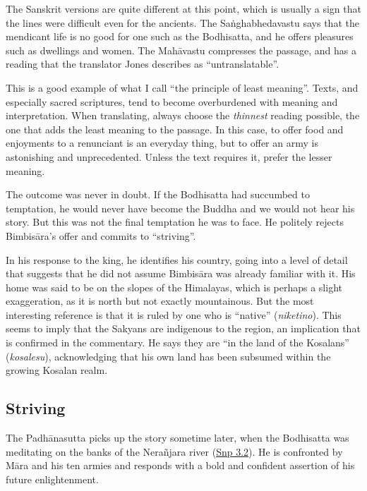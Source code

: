 \documentclass[12pt,openany]{book}%
\begin{document}
The Sanskrit versions are quite different at this point, which is usually a sign that the lines were difficult even for the ancients. The \textsanskrit{Saṅghabhedavastu} says that the mendicant life is no good for one such as the Bodhisatta, and he offers pleasures such as dwellings and women. The \textsanskrit{Mahāvastu} compresses the passage, and has a reading that the translator Jones describes as “untranslatable”.

This is a good example of what I call “the principle of least meaning”. Texts, and especially sacred scriptures, tend to become overburdened with meaning and interpretation. When translating, always choose the \emph{thinnest} reading possible, the one that adds the least meaning to the passage. In this case, to offer food and enjoyments to a renunciant is an everyday thing, but to offer an army is astonishing and unprecedented. Unless the text requires it, prefer the lesser meaning.

The outcome was never in doubt. If the Bodhisatta had succumbed to temptation, he would never have become the Buddha and we would not hear his story. But this was not the final temptation he was to face. He politely rejects \textsanskrit{Bimbisāra}’s offer and commits to “striving”.

In his response to the king, he identifies his country, going into a level of detail that suggests that he did not assume \textsanskrit{Bimbisāra} was already familiar with it. His home was said to be on the slopes of the Himalayas, which is perhaps a slight exaggeration, as it is north but not exactly mountainous. But the most interesting reference is that it is ruled by one who is “native” (\textit{niketino}). This seems to imply that the Sakyans are indigenous to the region, an implication that is confirmed in the commentary. He says they are “in the land of the Kosalans” (\textit{kosalesu}), acknowledging that his own land has been subsumed within the growing Kosalan realm.

\subsection*{Striving}

The \textsanskrit{Padhānasutta} picks up the story sometime later, when the Bodhisatta was meditating on the banks of the \textsanskrit{Nerañjara} river (\href{https://suttacentral.net/snp3.2/en/sujato}{Snp 3.2}). He is confronted by \textsanskrit{Māra} and his ten armies and responds with a bold and confident assertion of his future enlightenment.
\end{document}
